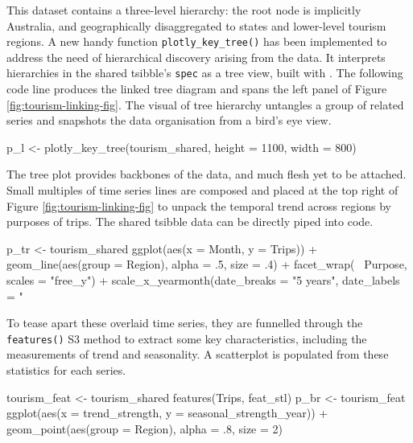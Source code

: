 This dataset contains a three-level hierarchy: the root node is
implicitly Australia, and geographically disaggregated to states and
lower-level tourism regions. A new handy function
\texttt{plotly\_key\_tree()} has been implemented to address the need of
hierarchical discovery arising from the data. It interprets hierarchies
in the shared tsibble's \texttt{spec} as a tree view, built with
. The following code line produces the linked tree
diagram and spans the left panel of Figure
\ref{fig:tourism-linking-fig}. The visual of tree hierarchy untangles a
group of related series and snapshots the data organisation from a
bird's eye view.

\begin{Schunk}
\begin{Sinput}
p_l <- plotly_key_tree(tourism_shared, height = 1100, width = 800)
\end{Sinput}
\end{Schunk}

The tree plot provides backbones of the data, and much flesh yet to be
attached. Small multiples of time series lines are composed and placed
at the top right of Figure \ref{fig:tourism-linking-fig} to unpack the
temporal trend across regions by purposes of trips. The shared tsibble
data can be directly piped into  code.

\begin{Schunk}
\begin{Sinput}
p_tr <- tourism_shared %
  ggplot(aes(x = Month, y = Trips)) +
  geom_line(aes(group = Region), alpha = .5, size = .4) +
  facet_wrap(~ Purpose, scales = "free_y") +
  scale_x_yearmonth(date_breaks = "5 years", date_labels = "%
\end{Sinput}
\end{Schunk}

To tease apart these overlaid time series, they are funnelled through
the \texttt{features()} S3 method to extract some key characteristics,
including the measurements of trend and seasonality. A scatterplot is
populated from these statistics for each series.

\begin{Schunk}
\begin{Sinput}
tourism_feat <- tourism_shared %
  features(Trips, feat_stl)
p_br <- tourism_feat %
  ggplot(aes(x = trend_strength, y = seasonal_strength_year)) +
  geom_point(aes(group = Region), alpha = .8, size = 2)
\end{Sinput}
\end{Schunk}

